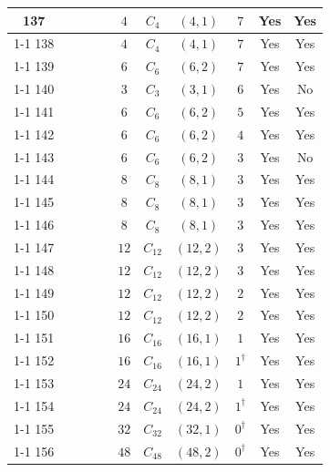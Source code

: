 \documentclass[12pt]{amsart}
\numberwithin{equation}{section}
\theoremstyle{plain}
\theoremstyle{definition}
\theoremstyle{remark}
\begin{document}
{\begin{longtable}{|c|c|c|c|c|c|c|c|c|c|c|}
137 &  &  &  &  & $4$ & \multicolumn{1}{c|}{$C_{4}$} & $(4,1)$ & $7$ & Yes & Yes \\ \cline{1-1} \cline{6-11}
138 &  &  &  &  & $4$ & \multicolumn{1}{c|}{$C_{4}$} & $(4,1)$ & $7$ & Yes & Yes \\ \cline{1-1} \cline{6-11}
139 &  &  &  &  & $6$ & \multicolumn{1}{c|}{$C_{6}$} & $(6,2)$ & $7$ & Yes & Yes \\ \cline{1-1} \cline{6-11}
140 &  &  &  &  & $3$ & \multicolumn{1}{c|}{$C_{3}$} & $(3,1)$ & $6$ & Yes & No \\ \cline{1-1} \cline{6-11}
141 &  &  &  &  & $6$ & \multicolumn{1}{c|}{$C_{6}$} & $(6,2)$ & $5$ & Yes & Yes \\ \cline{1-1} \cline{6-11}
142 &  &  &  &  & $6$ & \multicolumn{1}{c|}{$C_{6}$} & $(6,2)$ & $4$ & Yes & Yes \\ \cline{1-1} \cline{6-11}
143 &  &  &  &  & $6$ & \multicolumn{1}{c|}{$C_{6}$} & $(6,2)$ & $3$ & Yes & No \\ \cline{1-1} \cline{6-11}
144 &  &  &  &  & $8$ & \multicolumn{1}{c|}{$C_{8}$} & $(8,1)$ & $3$ & Yes & Yes \\ \cline{1-1} \cline{6-11}
145 &  &  &  &  & $8$ & \multicolumn{1}{c|}{$C_{8}$} & $(8,1)$ & $3$ & Yes & Yes \\ \cline{1-1} \cline{6-11}
146 &  &  &  &  & $8$ & \multicolumn{1}{c|}{$C_{8}$} & $(8,1)$ & $3$ & Yes & Yes \\ \cline{1-1} \cline{6-11}
147 &  &  &  &  & $12$ & \multicolumn{1}{c|}{$C_{12}$} & $(12,2)$ & $3$ & Yes & Yes \\ \cline{1-1} \cline{6-11}
148 &  &  &  &  & $12$ & \multicolumn{1}{c|}{$C_{12}$} & $(12,2)$ & $3$ & Yes & Yes \\ \cline{1-1} \cline{6-11}
149 &  &  &  &  & $12$ & \multicolumn{1}{c|}{$C_{12}$} & $(12,2)$ & $2$ & Yes & Yes \\ \cline{1-1} \cline{6-11}
150 &  &  &  &  & $12$ & \multicolumn{1}{c|}{$C_{12}$} & $(12,2)$ & $2$ & Yes & Yes \\ \cline{1-1} \cline{6-11}
151 &  &  &  &  & $16$ & \multicolumn{1}{c|}{$C_{16}$} & $(16,1)$ & $1$ & Yes & Yes \\ \cline{1-1} \cline{6-11}
152 &  &  &  &  & $16$ & \multicolumn{1}{c|}{$C_{16}$} & $(16,1)$ & $1^\dagger$ & Yes & Yes \\ \cline{1-1} \cline{6-11}
153 &  &  &  &  & $24$ & \multicolumn{1}{c|}{$C_{24}$} & $(24,2)$ & $1$ & Yes & Yes \\ \cline{1-1} \cline{6-11}
154 &  &  &  &  & $24$ & \multicolumn{1}{c|}{$C_{24}$} & $(24,2)$ & $1^\dagger$ & Yes & Yes \\ \cline{1-1} \cline{6-11}
155 &  &  &  &  & $32$ & \multicolumn{1}{c|}{$C_{32}$} & $(32,1)$ & $0^\dagger$ & Yes & Yes \\ \cline{1-1} \cline{6-11}
156 &  &  &  &  & $48$ & \multicolumn{1}{c|}{$C_{48}$} & $(48,2)$ & $0^\dagger$ & Yes & Yes \\ \hline
\end{longtable}
}
%
\end{document}
